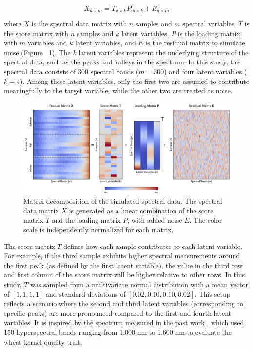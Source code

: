 \begin{equation} \label{eq_spectral}
    X_{n \times m} = T_{n \times k} P_{m \times k}^\top + E_{n \times m} 
\end{equation}

where $X$ is the spectral data matrix with $n$ samples and $m$ spectral variables, $T$ is the score matrix with $n$ samples and $k$ latent variables, $P$ is the loading matrix with $m$ variables and $k$ latent variables, and $E$ is the residual matrix to simulate noise (Figure ~\ref{fig:1_sim_data}). The $k$ latent variables represent the underlying structure of the spectral data, such as the peaks and valleys in the spectrum. In this study, the spectral data consists of 300 spectral bands ($m = 300$) and four latent variables ($k = 4$). Among these latent variables, only the first two are assumed to contribute meaningfully to the target variable, while the other two are treated as noise.

\begin{figure}[H]
    \centering
    \includegraphics[width=1\textwidth]{fig_1.jpg}
    \caption{Matrix decomposition of the simulated spectral data. The spectral data matrix $X$ is generated as a linear combination of the score matrix $T$ and the loading matrix $P$, with added noise $E$. The color scale is independently normalized for each matrix.}
    \label{fig:1_sim_data}
\end{figure}

The score matrix $T$ defines how each sample contributes to each latent variable. For example, if the third sample exhibits higher spectral measurements around the first peak (as defined by the first latent variable), the value in the third row and first column of the score matrix will be higher relative to other rows. In this study, $T$ was sampled from a multivariate normal distribution with a mean vector of $[1, 1, 1, 1]$ and standard deviations of $[0.02, 0.10, 0.10, 0.02]$. This setup reflects a scenario where the second and third latent variables (corresponding to specific peaks) are more pronounced compared to the first and fourth latent variables. It is inspired by the spectrum measured in the past work \citep{chen_independent_2023}, which used 150 hyperspectral bands ranging from 1,000 nm to 1,600 nm to evaluate the wheat kernel quality trait.

